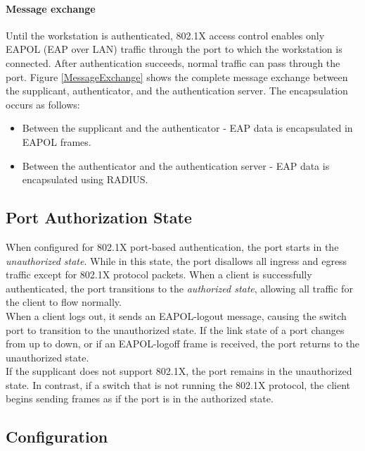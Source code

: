 \paragraph{Message exchange} Until the workstation is authenticated, 802.1X access control enables only EAPOL (EAP over LAN) traffic through the port to which the workstation is connected. After authentication succeeds, normal traffic can pass through the port. Figure \ref{MessageExchange} shows the complete message exchange between the supplicant, authenticator, and the authentication server. The encapsulation occurs as follows:

\begin{itemize}
\item Between the supplicant and the authenticator - EAP data is encapsulated in EAPOL frames.
\item Between the authenticator and the authentication server - EAP data is encapsulated using RADIUS.
\end{itemize}

\subsection{Port Authorization State}

When configured for 802.1X port-based authentication, the port starts in the \emph{unauthorized state}. While in this state, the port disallows all ingress and egress traffic except for 802.1X protocol packets. When a client is successfully authenticated, the port transitions to the \emph{authorized state}, allowing all traffic for the client to flow normally. \\

When a client logs out, it sends an EAPOL-logout message, causing the switch port to transition to the unauthorized state. If the link state of a port changes from up to down, or if an EAPOL-logoff frame is received, the port returns to the unauthorized state.\\    

If the supplicant does not support 802.1X, the port remains in the unauthorized state. In contrast, if a switch that is not running the 802.1X protocol, the client begins sending frames as if the port is in the authorized state.\\


\subsection{Configuration}

